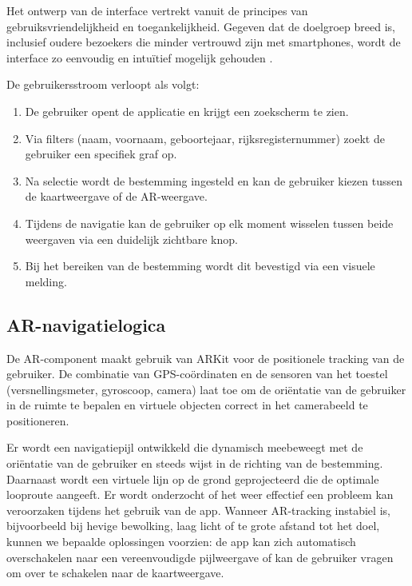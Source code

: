 Het ontwerp van de interface vertrekt vanuit de principes van gebruiksvriendelijkheid en toegankelijkheid. Gegeven dat de doelgroep breed is, inclusief oudere bezoekers die minder vertrouwd zijn met smartphones, wordt de interface zo eenvoudig en intuïtief mogelijk gehouden \autocite{Haekkilae2022}.

De gebruikersstroom verloopt als volgt:

\begin{enumerate}
    \item De gebruiker opent de applicatie en krijgt een zoekscherm te zien.
    \item Via filters (naam, voornaam, geboortejaar, rijksregisternummer) zoekt de gebruiker een specifiek graf op.
    \item Na selectie wordt de bestemming ingesteld en kan de gebruiker kiezen tussen de kaartweergave of de AR-weergave.
    \item Tijdens de navigatie kan de gebruiker op elk moment wisselen tussen beide weergaven via een duidelijk zichtbare knop.
    \item Bij het bereiken van de bestemming wordt dit bevestigd via een visuele melding.
\end{enumerate}

\subsection{AR-navigatielogica}

De AR-component maakt gebruik van ARKit voor de positionele tracking van de gebruiker. De combinatie van GPS-coördinaten en de sensoren van het toestel (versnellingsmeter, gyroscoop, camera) laat toe om de oriëntatie van de gebruiker in de ruimte te bepalen en virtuele objecten correct in het camerabeeld te positioneren.

Er wordt een navigatiepijl ontwikkeld die dynamisch meebeweegt met de oriëntatie van de gebruiker en steeds wijst in de richting van de bestemming. Daarnaast wordt een virtuele lijn op de grond geprojecteerd die de optimale looproute aangeeft. Er wordt onderzocht of het weer effectief een probleem kan veroorzaken tijdens het gebruik van de app. Wanneer AR-tracking instabiel is, bijvoorbeeld bij hevige bewolking, laag licht of te grote afstand tot het doel, kunnen we bepaalde oplossingen voorzien: de app kan zich automatisch overschakelen naar een vereenvoudigde pijlweergave of kan de gebruiker vragen om over te schakelen naar de kaartweergave. 

